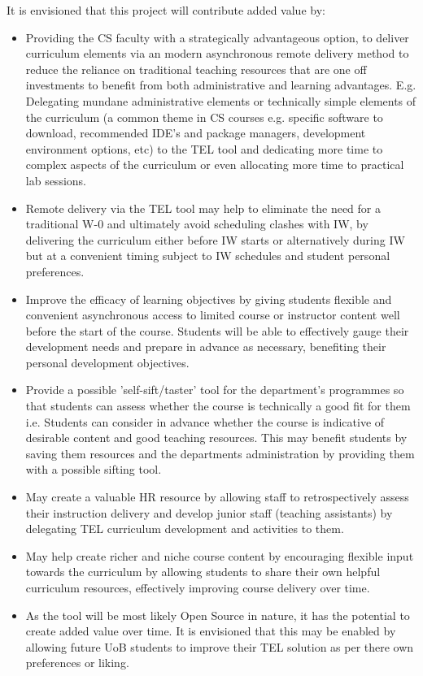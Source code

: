It is envisioned that this project will contribute added value by:
\begin{itemize}
    \item Providing the CS faculty with a strategically advantageous option, to deliver curriculum elements via an modern asynchronous remote delivery method to reduce the reliance on traditional teaching resources that are one off investments to benefit from both administrative and learning advantages. E.g. Delegating mundane administrative elements or technically simple elements of the curriculum (a common theme in CS courses e.g. specific software to download, recommended IDE's and package managers, development environment options, etc) to the TEL tool and dedicating more time to complex aspects of the curriculum or even allocating more time to practical lab sessions.
    
    \item Remote delivery via the TEL tool may help to eliminate the need for a traditional W-0 and ultimately avoid scheduling clashes with IW, by delivering the curriculum either before IW starts or alternatively during IW but at a  convenient timing subject to IW schedules and student personal preferences.
    
    \item Improve the efficacy of learning objectives by giving students flexible and convenient asynchronous access to limited course or instructor content well before the start of the course. Students will be able to effectively gauge their development needs and prepare in advance as necessary, benefiting their personal development objectives.
    
    \item Provide a possible 'self-sift/taster' tool for the department's programmes so that students can assess whether the course is technically a good fit for them i.e. Students can consider in advance whether the course is indicative of desirable content and good teaching resources. This may benefit students by saving them resources and the departments administration by providing them with a possible sifting tool.
    
    \item May create a valuable HR resource by allowing staff to retrospectively assess their instruction delivery and develop junior staff (teaching assistants) by delegating TEL curriculum development and activities to them.
    
    \item May help create richer and niche course content by encouraging flexible input towards the curriculum by allowing students to share their own helpful curriculum resources, effectively improving course delivery over time.
    
    \item As the tool will be most likely Open Source in nature, it has the potential to create added value over time. It is envisioned that this may be enabled by allowing future UoB students to improve their TEL solution as per there own preferences or liking.
    
\end{itemize}
